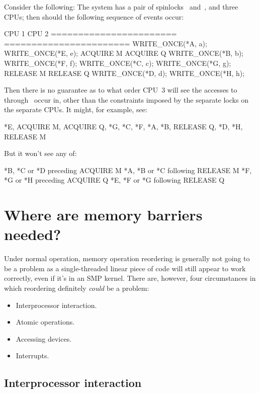 Consider the following:
The system has a pair of spinlocks~ and~, and three CPUs; then
should the following sequence of events occur:

\begin{VerbatimU}
	CPU 1                   CPU 2
	======================= =======================
	WRITE_ONCE(*A, a);      WRITE_ONCE(*E, e);
	ACQUIRE M               ACQUIRE Q
	WRITE_ONCE(*B, b);      WRITE_ONCE(*F, f);
	WRITE_ONCE(*C, c);      WRITE_ONCE(*G, g);
	RELEASE M               RELEASE Q
	WRITE_ONCE(*D, d);      WRITE_ONCE(*H, h);
\end{VerbatimU}

Then there is no guarantee as to what order CPU~3 will see the accesses
to~ through~ occur in, other than the constraints imposed by
the separate locks on the separate CPUs.
It might, for example, see:

\begin{VerbatimU}[tabsize=1]
	*E, ACQUIRE M, ACQUIRE Q, *G, *C, *F, *A, *B, RELEASE Q, *D, *H, RELEASE M
\end{VerbatimU}

But it won't see any of:

\begin{VerbatimU}
	*B, *C or *D preceding ACQUIRE M
	*A, *B or *C following RELEASE M
	*F, *G or *H preceding ACQUIRE Q
	*E, *F or *G following RELEASE Q
\end{VerbatimU}


\section{Where are memory barriers needed?}

Under normal operation, memory operation reordering is generally not going to
be a problem as a single-threaded linear piece of code will still appear to
work correctly, even if it's in an SMP kernel.
There are, however, four circumstances in which reordering definitely
\emph{could} be a problem:

\begin{itemize}
 \item Interprocessor interaction.
 \item Atomic operations.
 \item Accessing devices.
 \item Interrupts.
\end{itemize}

\subsection{Interprocessor interaction}

